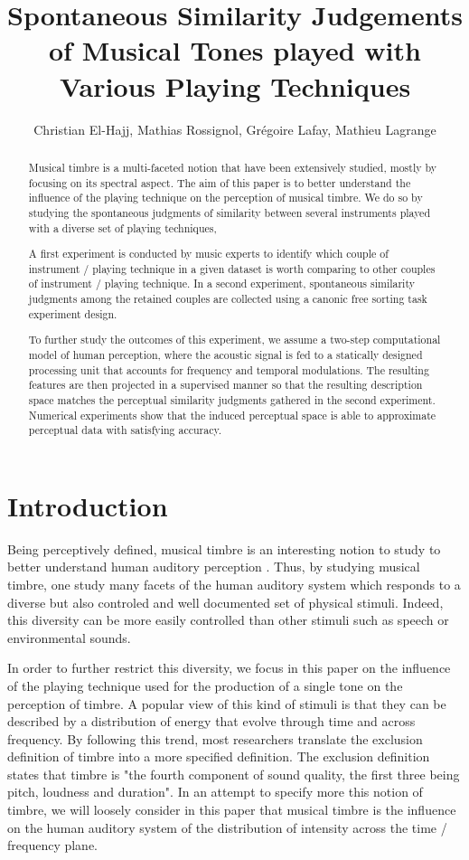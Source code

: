 \documentclass{article}
\title{Spontaneous Similarity Judgements of Musical Tones played with Various Playing Techniques}
\author{Christian El-Hajj, Mathias Rossignol, Gr\'egoire Lafay, Mathieu Lagrange}
\begin{document}
%
\maketitle
%
\begin{abstract}

Musical timbre is a multi-faceted notion that have been extensively studied, mostly by focusing on its spectral aspect. The aim of this paper is to better understand the influence of the playing technique on the perception of musical timbre. We do so by studying the spontaneous judgments of similarity between several instruments played with a diverse set of playing techniques,

A first experiment is conducted by music experts to identify which couple of instrument / playing technique in a given dataset is worth comparing to other couples of instrument / playing technique. In a second experiment, spontaneous similarity judgments among the retained couples are collected using a canonic free sorting task experiment design.

To further study the outcomes of this experiment, we assume a two-step computational model of human perception, where the acoustic signal is fed to a statically designed processing unit that accounts for frequency and temporal modulations. The resulting features are then projected in a supervised manner so that the resulting description space matches the perceptual similarity judgments gathered in the second experiment. Numerical experiments show that the induced perceptual space is able to approximate perceptual data with satisfying accuracy.

\end{abstract}
%
\section{Introduction}\label{sec:introduction}

Being perceptively defined, musical timbre is an interesting notion to study to better understand human auditory perception \cite{grey1977multidimensional}. Thus, by studying musical timbre, one study many facets of the human auditory system which responds to a diverse but also controled and well documented set of physical stimuli. Indeed, this diversity can be more easily controlled than other stimuli such as speech or environmental sounds.

In order to further restrict this diversity, we focus in this paper on the influence of the playing technique used for the production of a single tone on the perception of timbre. A popular view of this kind of stimuli is that they can be described by a distribution of energy that evolve through time and across frequency. By following this trend, most researchers translate the exclusion definition of timbre \cite{marozeau2003dependency} into a more specified definition. The exclusion definition states that timbre is "the fourth component of sound quality, the first three being pitch, loudness and duration". In an attempt to specify more this notion of timbre, we will loosely consider in this paper that musical timbre is the influence on the human auditory system of the distribution of intensity across the time / frequency plane.
\end{document}
